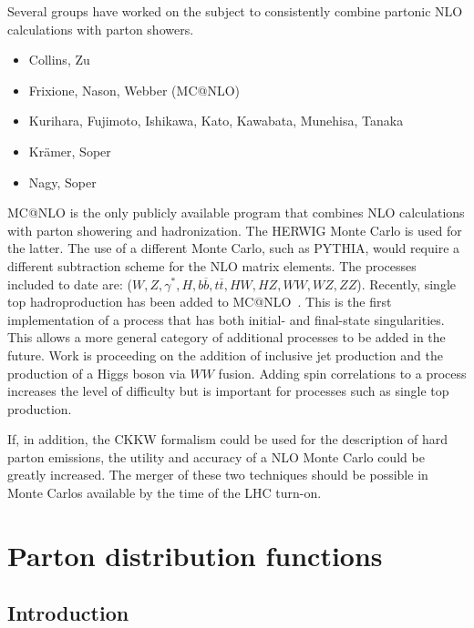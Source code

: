 \documentclass[12pt]{iopart}
\begin{document}
Several groups have worked on the subject to consistently 
combine partonic NLO calculations with parton showers. 
\begin{itemize}
\item  Collins, Zu~\cite{Chen:2001nf,Collins:2004vq}
\item  Frixione, Nason, Webber (MC@NLO) 
\cite{Frixione:2002ik,Frixione:2003ei,Frixione:2005gz} 
\item  Kurihara, Fujimoto, Ishikawa, Kato, Kawabata,
Munehisa, Tanaka~\cite{Kurihara:2002ne}
\item  Kr\"amer, Soper~\cite{Kramer:2003jk,Soper:2003ya,Kramer:2005hw}
\item  Nagy, Soper~\cite{Nagy:2005aa,Nagy:2006kb}
\end{itemize}

MC@NLO is the only publicly available program that combines NLO calculations with parton showering and
hadronization. The HERWIG Monte Carlo is used for  the latter. The use of a different Monte Carlo, such as PYTHIA,
would require a different subtraction scheme for  the NLO matrix elements. The processes included to date are:
($W,Z,\gamma^*,H,b\overline{b}, t\overline{t},HW,HZ,WW,WZ,ZZ$). Recently, single top hadroproduction has been added
to MC@NLO~\cite{Frixione:2005vw}. This is the first implementation of a process that has both initial- and
final-state singularities. This allows a more general category of additional processes to be added in the future. 
Work is proceeding on the addition of inclusive jet production and the production of a Higgs boson via $WW$ fusion.
Adding spin correlations to a process increases the level of difficulty but is important for processes
such as single top production. 

If, in addition, the CKKW formalism could be used for the description of hard parton emissions, the utility and
accuracy of a NLO Monte Carlo could be greatly increased. The merger of these two techniques should be possible in
Monte Carlos available by the time of the LHC turn-on. 

\section{Parton distribution functions}
\label{sec:pdfs}

\subsection{Introduction}
\label{sec:pdfintro}
\end{document}
